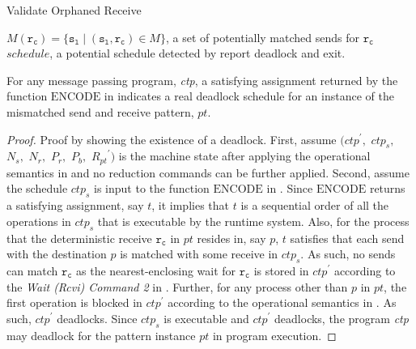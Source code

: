 \begin{algorithm}
\caption{Validate Orphaned Receive}\label{algo:vorphaned}
\begin{algorithmic}[1]
\Require $\mathit{M}(\mathtt{r_c}) = \{\mathtt{s_l}\mid(\mathtt{s_l},\mathtt{r_c})\in\mathit{M}\}$, a set of potentially matched sends for $\mathtt{r_c}$
\State  $\mathit{schedule}$, a potential schedule detected by 
\State report deadlock and exit.
\EndIf
\end{algorithmic}
\end{algorithm}





\begin{lemma}
For any message passing program, \textit{ctp}, a satisfying assignment returned by the function $\mathrm{ENCODE}$ in  indicates a real deadlock schedule for an instance of the mismatched send and receive pattern, $\mathit{pt}$. 
\label{lemma:mismatch}
\end{lemma}
\begin{proof}
Proof by showing the existence of a deadlock. First, assume $(\mathit{ctp}^\prime,$ $\mathit{ctp}_s,$ $\mathit{N_s},$ $\mathit{N_r},$ $\mathit{P_r},$ $\mathit{P_b},$ $\mathit{R_{pt}}^\prime)$ is the machine state after applying the operational semantics in  and no reduction commands can be further applied. Second, assume the schedule $\mathit{ctp}_s$ is input to the function $\mathrm{ENCODE}$ in . Since $\mathrm{ENCODE}$ returns a satisfying assignment, say $\mathit{t}$, it implies that $\mathit{t}$ is a sequential order of all the operations in $\mathit{ctp}_s$ that is executable by the runtime system. Also, for the process that the deterministic receive $\mathtt{r_c}$ in $\mathit{pt}$ resides in, say $\mathit{p}$, $\mathit{t}$ satisfies that each send with the destination $\mathit{p}$ is matched with some receive in $\mathit{ctp}_s$. As such, no sends can match $\mathtt{r_c}$ as the nearest-enclosing wait for $\mathtt{r_c}$ is stored in $\mathit{ctp}^\prime$ according to the \emph{Wait (Rcvi) Command 2} in . Further, for any process other than $\mathit{p}$ in $\mathit{pt}$, the first operation is blocked in $\mathit{ctp}^\prime$ according to the operational semantics in . As such, $\mathit{ctp}^\prime$ deadlocks. Since $\mathit{ctp}_s$ is executable and $\mathit{ctp}^\prime$ deadlocks, the program \textit{ctp} may deadlock for the pattern instance $\mathit{pt}$ in program execution. 
\end{proof}

